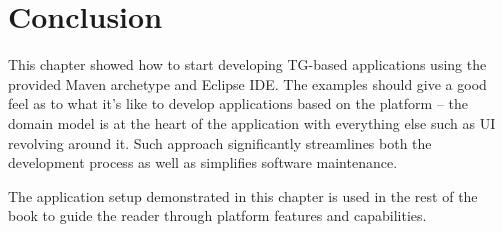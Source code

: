 \chapter{Conclusion}

  This chapter showed how to start developing TG-based applications using the provided Maven archetype and Eclipse IDE.
  The examples should give a good feel as to what it's like to develop applications based on the platform -- the domain model is at the heart of the application with everything else such as UI revolving around it.
  Such approach significantly streamlines both the development process as well as simplifies software maintenance.

  The application setup demonstrated in this chapter is used in the rest of the book to guide the reader through platform features and capabilities.